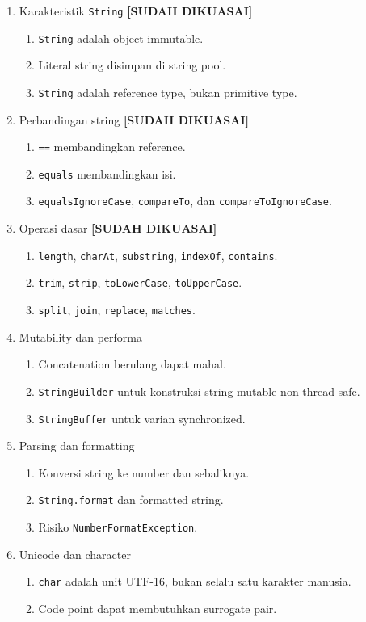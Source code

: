 \begin{enumerate}
    \item Karakteristik \texttt{String} \textbf{[SUDAH DIKUASAI]}
    \begin{enumerate}
        \item \texttt{String} adalah object immutable.
        \item Literal string disimpan di string pool.
        \item \texttt{String} adalah reference type, bukan primitive type.
    \end{enumerate}
    \item Perbandingan string \textbf{[SUDAH DIKUASAI]}
    \begin{enumerate}
        \item \texttt{==} membandingkan reference.
        \item \texttt{equals} membandingkan isi.
        \item \texttt{equalsIgnoreCase}, \texttt{compareTo}, dan \texttt{compareToIgnoreCase}.
    \end{enumerate}
    \item Operasi dasar \textbf{[SUDAH DIKUASAI]}
    \begin{enumerate}
        \item \texttt{length}, \texttt{charAt}, \texttt{substring}, \texttt{indexOf}, \texttt{contains}.
        \item \texttt{trim}, \texttt{strip}, \texttt{toLowerCase}, \texttt{toUpperCase}.
        \item \texttt{split}, \texttt{join}, \texttt{replace}, \texttt{matches}.
    \end{enumerate}
    \item Mutability dan performa
    \begin{enumerate}
        \item Concatenation berulang dapat mahal.
        \item \texttt{StringBuilder} untuk konstruksi string mutable non-thread-safe.
        \item \texttt{StringBuffer} untuk varian synchronized.
    \end{enumerate}
    \item Parsing dan formatting
    \begin{enumerate}
        \item Konversi string ke number dan sebaliknya.
        \item \texttt{String.format} dan formatted string.
        \item Risiko \texttt{NumberFormatException}.
    \end{enumerate}
    \item Unicode dan character
    \begin{enumerate}
        \item \texttt{char} adalah unit UTF-16, bukan selalu satu karakter manusia.
        \item Code point dapat membutuhkan surrogate pair.
    \end{enumerate}
\end{enumerate}

